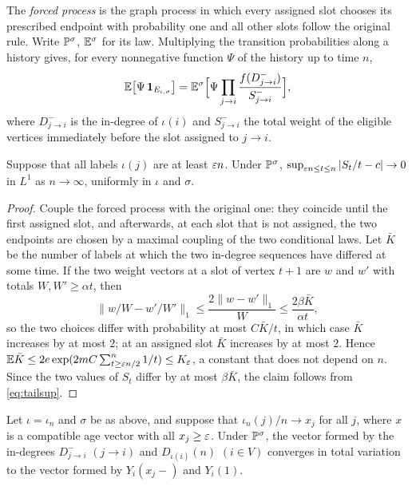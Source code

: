 The \emph{forced process} is the graph process in which every assigned slot chooses its prescribed endpoint with
probability one and all other slots follow the original rule. Write $\mathbb{P}^{\sigma}$, $\mathbb{E}^\sigma$ for its law.
Multiplying the transition probabilities along a history gives, for every nonnegative function $\Psi$ of the
history up to time $n$,
\begin{equation}\label{eq:com}
   \mathbb{E}\bigl[\Psi\,\mathbf 1_{E_{\iota,\sigma}}\bigr]
   =\mathbb{E}^\sigma\Bigl[\Psi\prod_{j\to i}\frac{f(D^-_{j\to i})}{S^-_{j\to i}}\Bigr],
\end{equation}
where $D^-_{j\to i}$ is the in-degree of $\iota(i)$ and $S^-_{j\to i}$ the total weight of the eligible vertices
immediately before the slot assigned to $j\to i$.

\begin{lemma}\label{lem:forcedS}
Suppose that all labels $\iota(j)$ are at least $\varepsilon n$. Under $\mathbb{P}^\sigma$,
$\sup_{\varepsilon n\le t\le n}|S_t/t-c|\to0$ in $L^1$ as $n\to\infty$, uniformly in $\iota$ and $\sigma$.
\end{lemma}

\begin{proof}
Couple the forced process with the original one: they coincide until the first assigned slot, and afterwards,
at each slot that is not assigned, the two endpoints are chosen by a maximal coupling of the two conditional
laws. Let $\bar K$ be the number of labels at which the two in-degree sequences have differed at some time. If
the two weight vectors at a slot of vertex $t+1$ are $w$ and $w'$ with totals $W,W'\ge\alpha t$, then
\[
   \bigl\|w/W-w'/W'\bigr\|_1\le\frac{2\|w-w'\|_1}{W}\le\frac{2\beta\bar K}{\alpha t},
\]
so the two choices differ with probability at most $C\bar K/t$, in which case $\bar K$ increases by at most $2$;
at an assigned slot $\bar K$ increases by at most $2$. Hence
$\mathbb{E}\bar K\le 2e\exp(2mC\sum_{t\ge\varepsilon n/2}^{n}1/t)\le K_\varepsilon$, a constant that does not depend on $n$. Since the
two values of $S_t$ differ by at most $\beta\bar K$, the claim follows from \eqref{eq:tailsup}.
\end{proof}

\begin{lemma}\label{lem:tagged}
Let $\iota=\iota_n$ and $\sigma$ be as above, and suppose that $\iota_n(j)/n\to x_j$ for all $j$, where $x$ is a
compatible age vector with all $x_j\ge\varepsilon$. Under $\mathbb{P}^\sigma$, the vector formed by the in-degrees
$D^-_{j\to i}$ $(j\to i)$ and $D_{\iota(i)}(n)$ $(i\in V)$ converges in total variation to the vector formed by
$Y_i(x_j-)$ and $Y_i(1)$.
\end{lemma}

